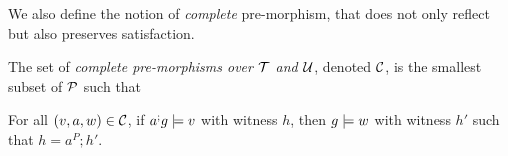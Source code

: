 We also define the notion of \emph{complete} pre-morphism, that does not only reflect but also preserves satisfaction.

\medskip\noindent
The set of \emph{complete pre-morphisms over ${\mathcal{T}}$ and ${\mathcal{U}}$}, denoted ${\mathcal{C}}$, is the smallest subset of ${\mathcal{P}}$ such that 

\begin{proposition}
For all $(v,a,w)\in {\mathcal{C}}$, if $a^;g\models v$ with witness $h$, then $g\models w$ with witness $h'$ such that $h=a^P;h'$.
\end{proposition}

